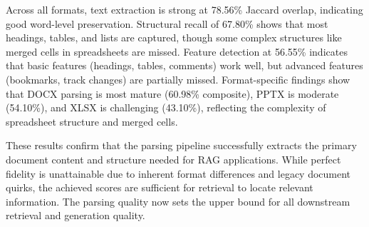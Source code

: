 \begin{table}[H]
    \centering
    \caption{Office-Based Evaluation Dataset Scale}
    \label{tab:office_dataset_scale}
\end{table}

\begin{table}[H]
    \centering
    \caption{Office-Based Evaluation Files by Format}
    \label{tab:office_format_distribution}
\end{table}

Across all formats, text extraction is strong at 78.56\% Jaccard overlap, indicating good word-level preservation. Structural recall of 67.80\% shows that most headings, tables, and lists are captured, though some complex structures like merged cells in spreadsheets are missed. Feature detection at 56.55\% indicates that basic features (headings, tables, comments) work well, but advanced features (bookmarks, track changes) are partially missed. Format-specific findings show that DOCX parsing is most mature (60.98\% composite), PPTX is moderate (54.10\%), and XLSX is challenging (43.10\%), reflecting the complexity of spreadsheet structure and merged cells.

These results confirm that the parsing pipeline successfully extracts the primary document content and structure needed for RAG applications. While perfect fidelity is unattainable due to inherent format differences and legacy document quirks, the achieved scores are sufficient for retrieval to locate relevant information. The parsing quality now sets the upper bound for all downstream retrieval and generation quality.

